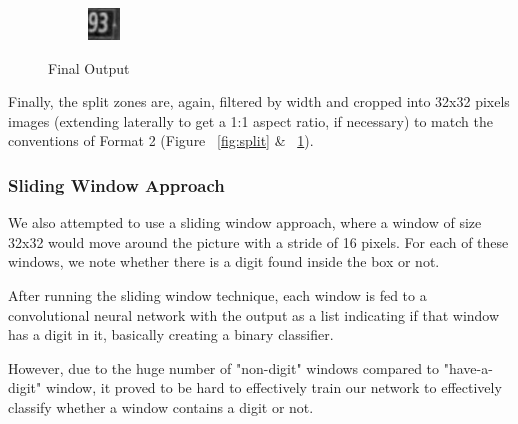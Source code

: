 \documentclass{article} %
\begin{document}
\begin{figure}
\begin{subfigure}{.3\textwidth}
\end{subfigure}
\begin{subfigure}{.3\textwidth}
  \centering
  \includegraphics[width=.8\linewidth]{images/image01}
\end{subfigure}
\caption{Final Output}
\label{fig:output}
\end{figure}

Finally, the split zones are, again, filtered by width and cropped into 32x32 pixels images (extending laterally to get a 1:1 aspect ratio, if necessary) to match the conventions of Format 2 (Figure ~\ref{fig:split} \& ~\ref{fig:output}).

\subsubsection{Sliding Window Approach}
We also attempted to use a sliding window approach, where a window of size 32x32
would move around the picture with a stride of 16 pixels. For each of these windows,
we note whether there is a digit found inside the box or not.

After running the sliding window technique, each window is fed to a convolutional neural network with
the output as a list indicating if that window has a digit in it, basically creating a binary classifier.

However, due to the huge number of "non-digit" windows compared to "have-a-digit" window, it proved to
be hard to effectively train our network to effectively classify whether a window contains a digit or not.
\end{document}
